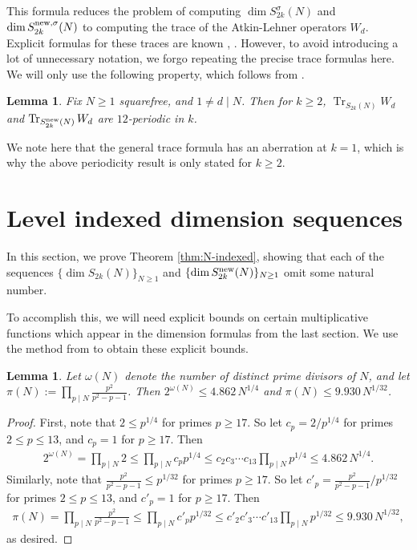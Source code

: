 \documentclass[12pt,letterpaper,reqno]{amsart}
\newtheorem{lemma}[theorem]{Lemma}
\theoremstyle{definition}
\numberwithin{equation}{section}
\numberwithin{figure}{section}
\numberwithin{table}{section}
\DeclareMathOperator{\Tr}{Tr}
\newcommand{\nw}{{\textnormal{new}}}
\begin{document}
This formula reduces the problem of computing $\dim S_{2k}^\sigma(N)$ and $\dim S_{2k}^{\nw,\sigma}(N)$ to computing the trace of the Atkin-Lehner operators $W_d$. Explicit formulas for these traces are known \cite{yamauchi}, \cite{kimball}.
However, to avoid introducing a lot of unnecessary notation, we forgo repeating the precise trace formulas here. We will only use the following property, which follows from \cite[Equation 1.6, Proposition 1.2]{kimball}. 
\begin{lemma} \label{lem:tr-W-d-periodic}
    Fix $N \ge 1$ squarefree, and $1 \ne d \mid N$. Then for $k \ge 2$, $\Tr_{S_{2k}(N)} W_d$ and $\Tr_{S_{2k}^\nw(N)} W_d$ are $12$-periodic in $k$.
\end{lemma}
We note here that the general trace formula has an aberration at $k=1$, which is why the above periodicity result is only stated for $k \ge 2$.


\section{Level indexed dimension sequences}

In this section, we prove Theorem \ref{thm:N-indexed}, showing that each of the sequences $\{ \dim S_{2k}(N) \}_{N\ge1}$ and $\{\dim S_{2k}^\nw(N) \}_{N\ge1}$ omit some natural number.

To accomplish this, we will need explicit bounds on certain multiplicative functions which appear in the dimension formulas from the last section. We use the method from \cite[Lemma 2.4]{ross} to obtain these explicit bounds.
\begin{lemma} \label{lemma:mult-bound}
    Let $\omega(N)$ denote the number of distinct prime divisors of $N$, and let 
    $ \displaystyle
        \pi(N) := \prod_{p\mid N} 
            \frac{p^2}{p^2-p-1} 
    $. 
    Then $
        2^{\omega(N)} \leq 4.862 \, N^{1/4} 
        $
        and 
        $
        \pi(N) \le 9.930 \, N^{1/32}
        $.
\end{lemma}
\begin{proof}
    First, note that $2 \le p^{1/4}$ for primes $p \ge 17$. So let $c_p = 2 / p^{1/4}$ for primes $2 \le p \le 13$, and $c_p = 1$ for $p \ge 17$. Then
    \begin{align}
        2^{\omega(N)} = \prod_{p \mid N} 2 \le \prod_{p \mid N} c_p p^{1/4} \le c_2 c_3 \cdots c_{13} \prod_{p \mid N} p^{1/4} \le 4.862\, N^{1/4}.
    \end{align}
    Similarly, note that $\frac{p^2}{p^2 - p - 1} \le p^{1/32}$ for primes $p \ge 17$. So let $c'_p = \frac{p^2}{p^2 - p - 1} / p^{1/32}$ for primes $2 \le p \le 13$, and $c'_p = 1$ for $p \ge 17$.
    Then
    \begin{align}
        \pi(N) = \prod_{p \mid N} \frac{p^2}{p^2 - p - 1} \le \prod_{p \mid N} c'_p p^{1/32} \le c'_2 c'_3 \cdots c'_{13} \prod_{p \mid N} p^{1/32} \le 9.930\, N^{1/32},
    \end{align}
    as desired.
\end{proof}
\end{document}
